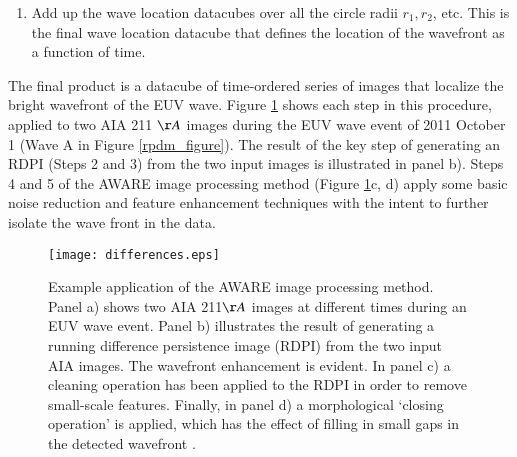 \begin{enumerate}
\begin{enumerate}
\item Apply a morphological closing operation.  This operation helps
  close small ‘cracks’ in structures \citep{2002dip..book.....G}.  The
  structuring element used is the same as that used by the median
  filtering operation. The final image is shown in Figure
  \ref{method_figure}d.  The final result is a datacube of images that
  show the location of the wavefront as a function of time, given the
  median filter and closing operations performed at length-scale $r$.
\end{enumerate}

\item Add up the wave location datacubes over all the circle radii
  $r_{1}, r_{2}$\textellipsis, etc.  This is the final wave location
  datacube that defines the location of the wavefront as a function of
  time.

\end{enumerate}

The final product is a datacube of time-ordered series of images that
localize the bright wavefront of the EUV wave.  Figure
\ref{method_figure} shows each step in this procedure, applied to two
AIA 211 $\AA$ images during the EUV wave event of 2011 October 1 (Wave
A in Figure \ref{rpdm_figure}).  The result of the key step of
generating an RDPI (Steps 2 and 3) from the two input images is
illustrated in panel b). Steps 4 and 5 of the AWARE image processing
method (Figure \ref{method_figure}c, d) apply some basic noise
reduction and feature enhancement techniques with the intent to
further isolate the wave front in the data.

\begin{figure}
\begin{center}
\texttt{[image: differences.eps]}
\caption{Example application of the AWARE image processing
  method. Panel a) shows two AIA 211$\AA$ images at different times
  during an EUV wave event. Panel b) illustrates the result of
  generating a running difference persistence image (RDPI) from the
  two input AIA images. The wavefront enhancement is evident. In panel
  c) a cleaning operation has been applied to the RDPI in order to
  remove small-scale features. Finally, in panel d) a morphological
  `closing operation' is applied, which has the effect of filling in
  small gaps in the detected wavefront
  \citep[e.g.][]{2002dip..book.....G}.}
\label{method_figure}
\end{center}
\end{figure}


